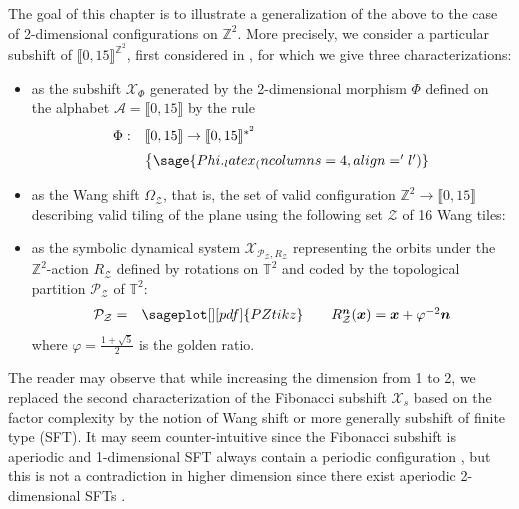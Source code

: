 \documentclass[12pt]{amsart}
\newcommand{\Z}{\mathbb{Z}}
\newcommand{\bn}{{\boldsymbol{n}}}
\newcommand{\bx}{{\boldsymbol{x}}}
\newcommand{\Acal}{\mathcal{A}} %
\newcommand{\Pcal}{\mathcal{P}}
\newcommand{\Xcal}{\mathcal{X}} %
\newcommand{\Zcal}{\mathcal{Z}}
\newcommand{\Zrange}[1]{\llbracket0,#1\rrbracket}
\newcommand{\torus}{\mathbb{T}}
\begin{document}
The goal of this chapter is to illustrate a generalization of the above
to the case of 2-dimensional configurations on $\Z^2$.
More precisely, we consider a particular subshift of $\Zrange{15}^{\Z^2}$,
first considered in \cite{lepsova_thesis_2024},
for which we give three characterizations:
\begin{itemize}
    \item as the subshift $\Xcal_\Phi$ generated by the 2-dimensional morphism
        $\Phi$ defined on the alphabet $\Acal=\Zrange{15}$ by the rule 
\begin{equation} %
\label{eq:definition-of-Phi} 
\begin{array}{ll}
    \Phi:&\Zrange{15}\to\Zrange{15}^{*^2}\\[2mm]
    &\left\{\footnotesize\arraycolsep=1.8pt
         \sage{Phi._latex_(ncolumns=4, align='l')}
    \right.
\end{array}
\end{equation}
    \item as the Wang shift $\Omega_\Zcal$,
        that is, the set of valid configuration $\Z^2\to\Zrange{15}$
        describing valid tiling of the plane using the following set $\Zcal$ of
        16 Wang tiles:
\begin{center}
\end{center}
    \item as the symbolic dynamical system $\Xcal_{\Pcal_\Zcal,R_\Zcal}$
        representing the orbits under
        the $\Z^2$-action $R_\Zcal$ defined by
        rotations on %
        $\torus^2$
        and coded by the topological partition $\Pcal_\Zcal$ of
        $\torus^2$:
    \[
    \begin{array}{c}
        \Pcal_\Zcal=
    \end{array}
    \begin{array}{c} 
        \sageplot[][pdf]{PZtikz}
    \end{array}
    \quad
    \begin{array}{l}
        R_\Zcal^\bn(\bx)=\bx+\varphi^{-2}\bn
    \end{array}
    \] 
    where $\varphi=\frac{1+\sqrt{5}}{2}$ is the golden ratio.
\end{itemize}

The reader may observe that while increasing the dimension from 1 to 2, we
replaced the second characterization of the Fibonacci subshift $\Xcal_s$ based on the factor
complexity by the notion of Wang shift or more generally subshift of finite type (SFT).
It may seem counter-intuitive since the Fibonacci subshift is aperiodic and 
1-dimensional SFT always contain a periodic
configuration \cite{MR1369092}, but this is not a contradiction in higher dimension 
since there exist aperiodic 2-dimensional SFTs \cite{MR0216954}.
\end{document}
